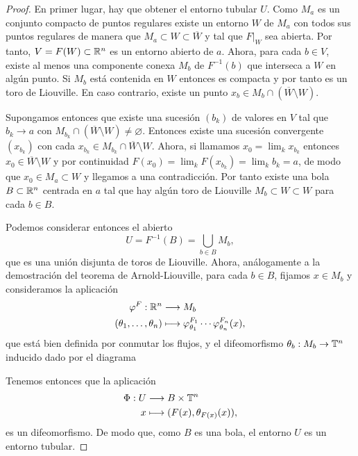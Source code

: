 \begin{proof}
  En primer lugar, hay que obtener el entorno tubular $U$. Como $M_a$ es un conjunto compacto de puntos regulares existe un entorno $W$ de $M_a$ con todos sus puntos regulares de manera que $M_a\subset W \subset \overline{W}$ y tal que $F|_W$ sea abierta. Por tanto, $V=F(W)\subset \mathbb{R}^n$ es un entorno abierto de $a$. Ahora, para cada $b\in V$, existe al menos una componente conexa $M_b$ de $F^{-1}(b)$ que interseca a $W$ en algún punto. Si $M_b$ está contenida en $W$ entonces es compacta y por tanto es un toro de Liouville. En caso contrario, existe un punto $x_b\in M_{b}\cap (\overline{W}\setminus W)$.
  
  Supongamos entonces que existe una sucesión $(b_k)$ de valores en $V$ tal que $b_k\rightarrow a$ con $M_{b_k}\cap(\overline{W}\setminus W) \neq \varnothing$. Entonces existe una sucesión convergente $(x_{b_k})$ con cada $x_{b_k}\in M_{b_k}\cap \overline{W}\setminus W$. Ahora, si llamamos $x_0=\lim_k x_{b_k}$ entonces $x_0\in \overline{W}\setminus W$ y por continuidad $F(x_0)=\lim_k F(x_{b_k})=\lim_k b_k =a$, de modo que $x_0 \in M_a\subset W$ y llegamos a una contradicción. Por tanto existe una bola $B\subset \mathbb{R}^n$ centrada en $a$ tal que hay algún toro de Liouville $M_b\subset W \subset W$ para cada $b\in B$. 
  
  Podemos considerar entonces el abierto 
  \begin{equation*}
    U=F^{-1}(B)=\bigcup_{b\in B}M_b,
  \end{equation*}
  que es una unión disjunta de toros de Liouville. Ahora, análogamente a la demostración del teorema de Arnold-Liouville, para cada $b\in B$, fijamos $x\in M_b$ y consideramos la aplicación
  \begin{align*}
    \varphi^F :\mathbb{R}^n&\longrightarrow M_b\\ 
    (\theta_1,\dots,\theta_n) &\longmapsto \varphi_{\theta_1}^{F_1}\cdots \varphi_{\theta_n}^{F_n}(x), 
    \end{align*}
    que está bien definida por conmutar los flujos, y el difeomorfismo $\theta_b:M_b\rightarrow \mathbb{T}^n$ inducido dado por el diagrama
    \begin{center}
     \end{center}
     Tenemos entonces que la aplicación
     \begin{align*}
       \Phi :U&\longrightarrow B\times \mathbb{T}^n\\ 
       x &\longmapsto (F(x),\theta_{F(x)}(x)), 
       \end{align*}
       es un difeomorfismo. De modo que, como $B$ es una bola, el entorno $U$ es un entorno tubular.


\end{proof}
